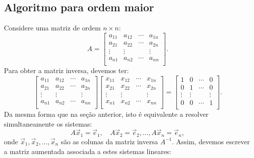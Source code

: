 \documentclass[../livro.tex]{subfiles}  %
\begin{document}
\subsection{Algoritmo para ordem maior}\label{scn:alg-ordem-maior}

Considere uma matriz de ordem $n \times n$:
\begin{equation}
A =
\left[
\begin{array}{cccc}
a_{11} & a_{12} & \cdots & a_{1n} \\
a_{21} & a_{22} & \cdots & a_{2n} \\
\vdots & \vdots &        & \vdots \\
a_{n1} & a_{n2} & \cdots & a_{nn} \\
\end{array}
\right].
\end{equation} Para obter a matriz inversa, devemos ter:
\begin{equation}
\left[
\begin{array}{cccc}
a_{11} & a_{12} & \cdots & a_{1n} \\
a_{21} & a_{22} & \cdots & a_{2n} \\
\vdots & \vdots &        & \vdots \\
a_{n1} & a_{n2} & \cdots & a_{nn} \\
\end{array}
\right]
\left[
\begin{array}{cccc}
x_{11} & x_{12} & \cdots & x_{1n} \\
x_{21} & x_{22} & \cdots & x_{2n} \\
\vdots & \vdots &        & \vdots \\
x_{n1} & x_{n2} & \cdots & x_{nn} \\
\end{array}
\right]
=
\left[
\begin{array}{cccc}
1   &    0   & \cdots &    0   \\
0   &    1   & \cdots &    0   \\
\vdots & \vdots &        & \vdots \\
0   &    0   & \cdots &    1   \\
\end{array}
\right].
\end{equation} Da mesma forma que na seção anterior, isto é equivalente a resolver simultaneamente os sistemas:
\begin{equation}
A \vec{x}_1 = \vec{e}_1, \quad A \vec{x}_2 = \vec{e}_2, \dots, A \vec{x}_n = \vec{e}_n,
\end{equation} onde $\vec{x}_1, \vec{x}_2, \dots, \vec{x}_n$ são as colunas da matriz inversa $A^{-1}$. Assim, devemos escrever a matriz aumentada associada a estes sistemas lineares:
\end{document}

